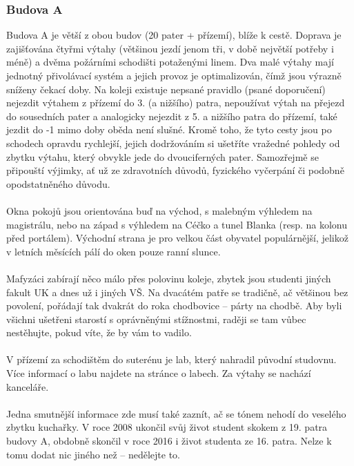 \subsubsection{Budova A}
Budova A je větší z obou budov (20 pater + přízemí), blíže k cestě. Doprava je
zajišťována čtyřmi výtahy (většinou jezdí jenom tři, v době největší potřeby i
méně) a dvěma požárními schodišti potaženými linem. Dva malé výtahy mají
jednotný přivolávací systém a jejich provoz je optimalizován, čímž jsou výrazně
sníženy čekací doby. Na koleji existuje nepsané pravidlo (psané doporučení)
nejezdit výtahem z přízemí do 3. (a nižšího) patra, nepoužívat výtah na přejezd
do sousedních pater a analogicky nejezdit z 5. a nižšího patra do přízemí, také
jezdit do -1 mimo doby oběda není slušné. Kromě toho, že tyto cesty jsou po
schodech opravdu rychlejší, jejich dodržováním si ušetříte vražedné pohledy od
zbytku výtahu, který obvykle jede do dvouciferných pater. Samozřejmě se
připouští výjimky, ať už ze zdravotních důvodů, fyzického vyčerpání či podobně
opodstatněného důvodu.
\\\\
Okna pokojů jsou orientována buď na východ, s malebným výhledem na magistrálu,
nebo na západ s výhledem na Céčko a tunel Blanka (resp. na kolonu před
portálem). Východní strana je pro velkou část obyvatel populárnější, jelikož v
letních měsících pálí do oken pouze ranní slunce.
\\\\
Mafyzáci zabírají něco málo přes polovinu koleje, zbytek jsou studenti jiných
fakult UK a dnes už i jiných VŠ. Na dvacátém patře se tradičně, ač většinou bez
povolení, pořádají tak dvakrát do roka chodbovice – párty na chodbě. Aby byli
všichni ušetřeni starostí s oprávněnými stížnostmi, raději se tam vůbec
nestěhujte, pokud víte, že by vám to vadilo.
\\\\
V přízemí za schodištěm do suterénu je lab, který nahradil původní studovnu.
Více informací o labu najdete na stránce o labech. Za výtahy se nachází
kanceláře.
\\\\
Jedna smutnější informace zde musí také zaznít, ač se tónem nehodí do veselého
zbytku kuchařky. V roce 2008 ukončil svůj život student skokem z 19. patra
budovy A, obdobně skončil v roce 2016 i život studenta ze 16. patra. Nelze k
tomu dodat nic jiného než – nedělejte to.



